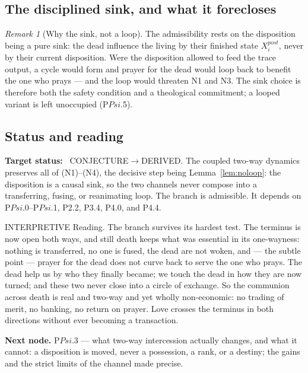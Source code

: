 \documentclass[11pt,a4paper]{article}
\def\Psi{Psi}%
\def\mathrm#1{#1}%
\def\emph#1{#1}%
\newcommand{\stDerived}{\textcolor{cDer}{\textsf{\small DERIVED}}}
\newcommand{\stInterp}{\textcolor{cInt}{\textsf{\small INTERPRETIVE}}}
\newcommand{\stConj}{\textcolor{cCon}{\textsf{\small CONJECTURE}}}
\theoremstyle{definition}
\theoremstyle{plain}
\theoremstyle{remark}
\newtheorem{remark}[definition]{Remark}
\begin{document}
\subsection{The disciplined sink, and what it forecloses}

\begin{remark}[Why the sink, not a loop]\label{rem:sink}
The admissibility rests on the disposition being a pure sink: the dead influence the living by
their \emph{finished} state \(X_i^{\mathrm{post}}\), never by their current disposition. Were
the disposition allowed to feed the trace output, a cycle would form and prayer for the dead
would loop back to benefit the one who prays --- and the loop would threaten N1 and N3. The
sink choice is therefore both the safety condition and a theological commitment; a looped
variant is left unoccupied (P$\Psi$.5).
\end{remark}

\subsection{Status and reading}

\textbf{Target status:}~
\stConj\(\to\)\stDerived. The coupled two-way dynamics preserves all of (N1)--(N4), the
decisive step being Lemma~\ref{lem:noloop}: the disposition is a causal sink, so the two
channels never compose into a transferring, fusing, or reanimating loop. The branch is
admissible. It depends on P$\Psi$.0--P$\Psi$.1, P2.2, P3.4, P4.0, and P4.4.

\medskip
\stInterp\quad
\emph{Reading.}
The branch survives its hardest test. The terminus is now open both ways, and still death
keeps what was essential in its one-wayness: nothing is transferred, no one is fused, the dead
are not woken, and --- the subtle point --- prayer for the dead does not curve back to serve
the one who prays. The dead help us by who they finally became; we touch the dead in how they
are now turned; and these two never close into a circle of exchange. So the communion across
death is real and two-way and yet wholly non-economic: no trading of merit, no banking, no
return on prayer. Love crosses the terminus in both directions without ever becoming a
transaction.

\medskip
\textbf{Next node.} P$\Psi$.3 --- what two-way intercession actually changes, and what it
cannot: a disposition is moved, never a possession, a rank, or a destiny; the gains and the
strict limits of the channel made precise.
\end{document}
